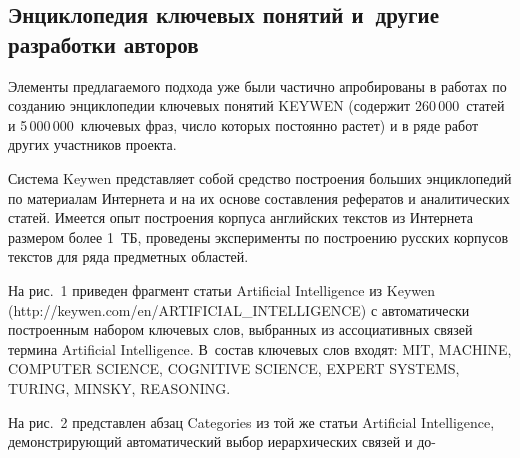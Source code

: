 \begin{multicols}{2}
   \section{Энциклопедия ключевых понятий и~другие разработки 
авторов}
    
     Элементы предлагаемого подхода уже были час\-тич\-но апробированы 
в работах по созданию эн\-цик\-ло\-пе\-дии ключевых понятий KEYWEN 
(содержит 260\,000~статей и 5\,000\,000~клю\-че\-вых фраз, число которых 
постоянно растет) и в ряде работ других участников проекта.
     
     Система Keywen представляет собой средство построения больших 
энциклопедий по материалам Интернета и на их основе составления 
рефератов и аналитических статей. Имеется опыт построения корпуса 
английских текстов из Интернета размером более 1~ТБ, проведены 
эксперименты по по\-стро\-ению русских корпусов текстов для ряда 
предметных областей.
     
     На рис.~1 приведен фрагмент \mbox{статьи} Artificial Intelligence из Keywen 
({\sf http://keywen.com/en/\linebreak ARTIFICIAL\_INTELLIGENCE}) с автоматически 
построенным набором ключевых слов, выбранных из ассоциативных 
связей термина Artificial Intelligence. В~состав ключевых слов входят: MIT, 
MACHINE, COMPUTER SCIENCE, COGNITIVE SCIENCE, EXPERT 
SYSTEMS, TURING, MINSKY, REASONING.

  

    
     На рис.~2 представлен абзац Categories из той же статьи 
Artificial Intelligence, демонстрирующий автоматический выбор 
иерархических связей и до-\linebreak\vspace*{-12pt}

\pagebreak

\end{multicols}

\begin{figure} %
\vspace*{1pt}
 \begin{center}
 \mbox{%
 \epsfxsize=155mm
 }
 \end{center}
 \vspace*{-6pt}
\vspace*{15pt}
 \begin{center}
 \mbox{%
 \epsfxsize=155mm
 }
 \end{center}
 \vspace*{-6pt}
\end{figure}

